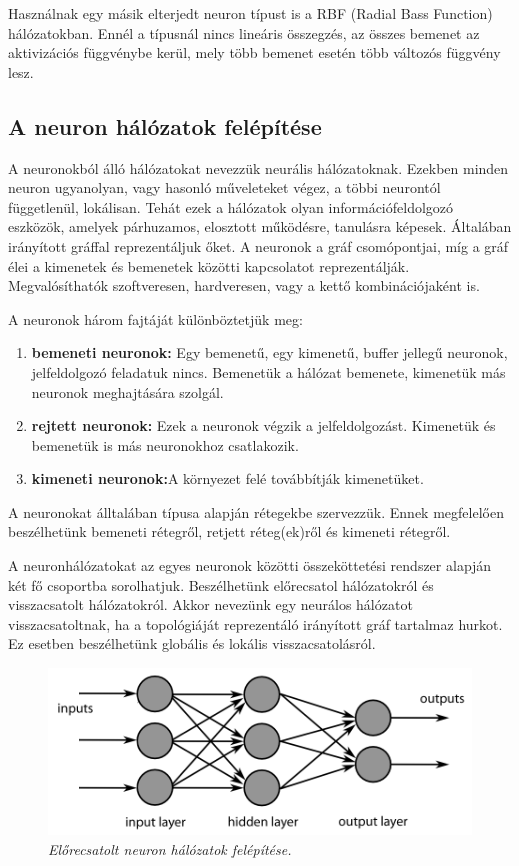 \documentclass[a4paper]{article}
\begin{document}
Használnak egy másik elterjedt neuron típust is a RBF (Radial Bass Function) hálózatokban. Ennél a típusnál nincs lineáris összegzés,  az összes bemenet az aktivizációs függvénybe kerül, mely több bemenet esetén több változós függvény lesz.

\subsection{A neuron hálózatok felépítése}
A neuronokból álló hálózatokat nevezzük neurális hálózatoknak. Ezekben minden neuron ugyanolyan, vagy hasonló műveleteket végez, a többi neurontól függetlenül, lokálisan. Tehát ezek a hálózatok olyan információfeldolgozó eszközök, amelyek párhuzamos, elosztott működésre, tanulásra képesek. Általában irányított gráffal reprezentáljuk őket. A neuronok a gráf csomópontjai, míg a gráf élei a kimenetek és bemenetek közötti kapcsolatot reprezentálják. Megvalósíthatók szoftveresen, hardveresen, vagy a kettő kombinációjaként is. 

A neuronok három fajtáját különböztetjük meg:
\begin{enumerate}
    \item\textbf{bemeneti neuronok:} Egy bemenetű, egy kimenetű, buffer jellegű neuronok, jelfeldolgozó feladatuk nincs. Bemenetük a hálózat bemenete, kimenetük más neuronok meghajtására szolgál.
    \item\textbf{rejtett neuronok:} Ezek a neuronok végzik a jelfeldolgozást. Kimenetük és bemenetük is más neuronokhoz csatlakozik.
    \item\textbf{kimeneti neuronok:}A környezet felé továbbítják kimenetüket.
\end{enumerate}

A neuronokat álltalában típusa alapján rétegekbe szervezzük. Ennek megfelelően beszélhetünk bemeneti rétegről, retjett réteg(ek)ről és kimeneti rétegről.

A neuronhálózatokat az egyes neuronok közötti összeköttetési rendszer alapján két fő csoportba sorolhatjuk. Beszélhetünk előrecsatol hálózatokról és visszacsatolt hálózatokról. Akkor nevezünk egy neurálos hálózatot visszacsatoltnak, ha a topológiáját reprezentáló irányított gráf tartalmaz hurkot. Ez esetben beszélhetünk  globális és lokális visszacsatolásról.

\begin{figure}[hb]
  \centering
  \includegraphics[width=1\textwidth]{neuron_layers}
  \caption{\textit{Előrecsatolt neuron hálózatok felépítése.}}
\end{figure}
\end{document}
